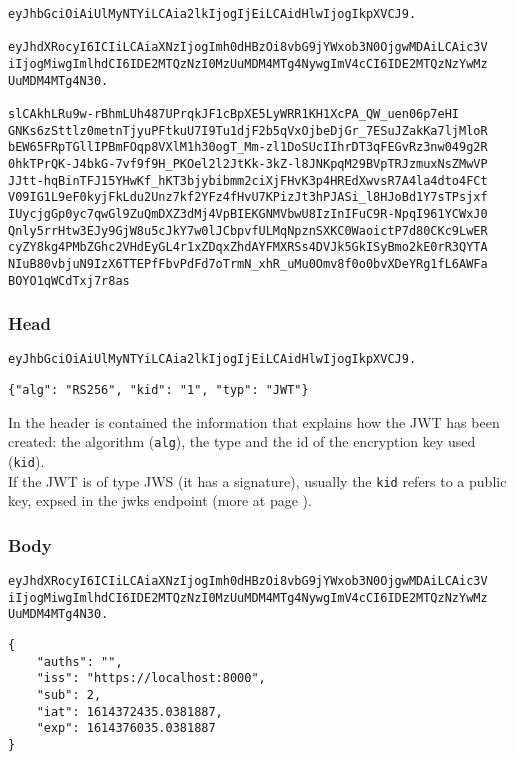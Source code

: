\begin{lstlisting}
eyJhbGciOiAiUlMyNTYiLCAia2lkIjogIjEiLCAidHlwIjogIkpXVCJ9.

eyJhdXRocyI6ICIiLCAiaXNzIjogImh0dHBzOi8vbG9jYWxob3N0OjgwMDAiLCAic3V
iIjogMiwgImlhdCI6IDE2MTQzNzI0MzUuMDM4MTg4NywgImV4cCI6IDE2MTQzNzYwMz
UuMDM4MTg4N30.

slCAkhLRu9w-rBhmLUh487UPrqkJF1cBpXE5LyWRR1KH1XcPA_QW_uen06p7eHI
GNKs6zSttlz0metnTjyuPFtkuU7I9Tu1djF2b5qVxOjbeDjGr_7ESuJZakKa7ljMloR
bEW65FRpTGllIPBmFOqp8VXlM1h30ogT_Mm-zl1DoSUcIIhrDT3qFEGvRz3nw049g2R
0hkTPrQK-J4bkG-7vf9f9H_PKOel2l2JtKk-3kZ-l8JNKpqM29BVpTRJzmuxNsZMwVP
JJtt-hqBinTFJ15YHwKf_hKT3bjybibmm2ciXjFHvK3p4HREdXwvsR7A4la4dto4FCt
V09IG1L9eF0kyjFkLdu2Unz7kf2YFz4fHvU7KPizJt3hPJASi_l8HJoBd1Y7sTPsjxf
IUycjgGp0yc7qwGl9ZuQmDXZ3dMj4VpBIEKGNMVbwU8IzInIFuC9R-NpqI961YCWxJ0
Qnly5rrHtw3EJy9GjW8u5cJkY7w0lJCbpvfULMqNpznSXKC0WaoictP7d80CKc9LwER
cyZY8kg4PMbZGhc2VHdEyGL4r1xZDqxZhdAYFMXRSs4DVJk5GkISyBmo2kE0rR3QYTA
NIuB80vbjuN9IzX6TTEPfFbvPdFd7oTrmN_xhR_uMu0Omv8f0o0bvXDeYRg1fL6AWFa
BOYO1qWCdTxj7r8as
\end{lstlisting}

\subsubsection{Head}
\begin{lstlisting}
eyJhbGciOiAiUlMyNTYiLCAia2lkIjogIjEiLCAidHlwIjogIkpXVCJ9.
\end{lstlisting}
\begin{lstlisting}
{"alg": "RS256", "kid": "1", "typ": "JWT"}
\end{lstlisting}

In the header is contained the information that explains how the JWT has been
created: the algorithm (\texttt{alg}), the type and the id of the encryption key
used (\texttt{kid}).
\\
If the JWT is of type JWS (it has a signature), usually the \texttt{kid} refers
to a public key, expsed in the jwks endpoint (more at page \pageref{jwks}).

\subsubsection{Body}
\begin{lstlisting}
eyJhdXRocyI6ICIiLCAiaXNzIjogImh0dHBzOi8vbG9jYWxob3N0OjgwMDAiLCAic3V
iIjogMiwgImlhdCI6IDE2MTQzNzI0MzUuMDM4MTg4NywgImV4cCI6IDE2MTQzNzYwMz
UuMDM4MTg4N30.
\end{lstlisting}
\begin{lstlisting}
{
    "auths": "",
    "iss": "https://localhost:8000",
    "sub": 2,
    "iat": 1614372435.0381887,
    "exp": 1614376035.0381887
}
\end{lstlisting}

